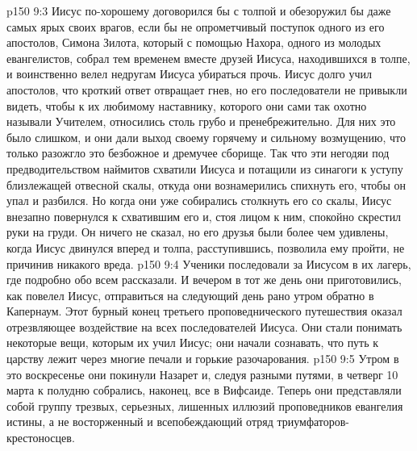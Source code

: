 \vs p150 9:3 Иисус по\hyp{}хорошему договорился бы с толпой и обезоружил бы даже самых ярых своих врагов, если бы не опрометчивый поступок одного из его апостолов, Симона Зилота, который с помощью Нахора, одного из молодых евангелистов, собрал тем временем вместе друзей Иисуса, находившихся в толпе, и воинственно велел недругам Иисуса убираться прочь. Иисус долго учил апостолов, что кроткий ответ отвращает гнев, но его последователи не привыкли видеть, чтобы к их любимому наставнику, которого они сами так охотно называли Учителем, относились столь грубо и пренебрежительно. Для них это было слишком, и они дали выход своему горячему и сильному возмущению, что только разожгло это безбожное и дремучее сборище. Так что эти негодяи под предводительством наймитов схватили Иисуса и потащили из синагоги к уступу близлежащей отвесной скалы, откуда они вознамерились спихнуть его, чтобы он упал и разбился. Но когда они уже собирались столкнуть его со скалы, Иисус внезапно повернулся к схватившим его и, стоя лицом к ним, спокойно скрестил руки на груди. Он ничего не сказал, но его друзья были более чем удивлены, когда Иисус двинулся вперед и толпа, расступившись, позволила ему пройти, не причинив никакого вреда.
\vs p150 9:4 Ученики последовали за Иисусом в их лагерь, где подробно обо всем рассказали. И вечером в тот же день они приготовились, как повелел Иисус, отправиться на следующий день рано утром обратно в Капернаум. Этот бурный конец третьего проповеднического путешествия оказал отрезвляющее воздействие на всех последователей Иисуса. Они стали понимать некоторые вещи, которым их учил Иисус; они начали сознавать, что путь к царству лежит через многие печали и горькие разочарования.
\vs p150 9:5 Утром в это воскресенье они покинули Назарет и, следуя разными путями, в четверг 10 марта к полудню собрались, наконец, все в Вифсаиде. Теперь они представляли собой группу трезвых, серьезных, лишенных иллюзий проповедников евангелия истины, а не восторженный и всепобеждающий отряд триумфаторов\hyp{}крестоносцев.
